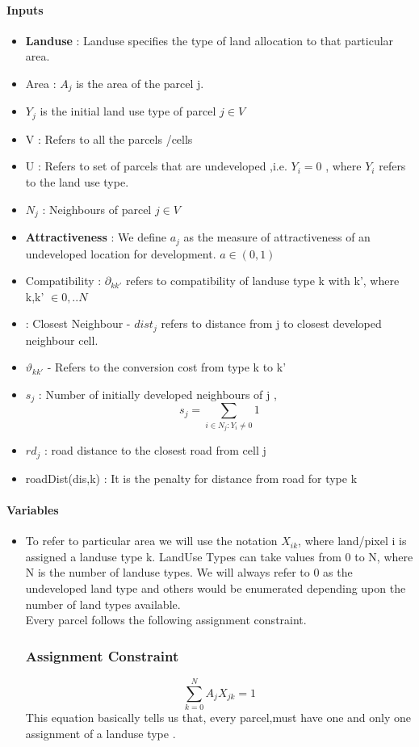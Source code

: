 \documentclass[12pt]{article} %
\begin{document}
\paragraph{Inputs\\}
\begin{itemize}
\item  \textbf{Landuse }: Landuse specifies the type of land allocation to that particular area.
\item Area : $A_j$ is the area of the parcel j.
\item $Y_j$ is the initial land use type of parcel $j \in V$
\item V : Refers to all the parcels /cells
\item U : Refers to set of parcels that are undeveloped ,i.e.
$ Y_{i} = 0$ , where  $Y_{i}$ refers to the land use type. 
\item $N_j$ : Neighbours of parcel $j \in V$    
\item \textbf{Attractiveness} : We define $a_j$  as the measure of attractiveness of an undeveloped location for development. 
$ a \in (0,1)$
\item Compatibility : $\partial_{kk'}$ refers to compatibility of landuse type k with k', where k,k' $\in {0,..N}$
\item : Closest Neighbour -  $dist_j$ refers to distance from j to closest developed neighbour cell.
\item $\vartheta_{kk'} $ - Refers to the conversion cost from  type k to k'
\item $s_j$ : Number of initially developed neighbours of j , $$ s_j = \sum_{i \in N_j: Y_i \neq 0} 1$$
\item $rd_j$ : road distance to the closest road from cell  j
\item roadDist(dis,k) : It is the penalty for distance from road for type k

\end{itemize}

\paragraph{Variables\\}
\begin{itemize}
\item  To refer to particular area we will use the notation $X_{ik}$, where land/pixel i is assigned a landuse type k. LandUse Types can take values from 0 to N, where N is the number of landuse types. We will always refer to 0 as the undeveloped land type and others would be enumerated depending upon the number of land types available.\\
Every parcel follows the following assignment constraint.

\subsubsection*{Assignment Constraint}
$$\sum_{k=0}^N A_j X_{jk} =1$$
This equation basically tells us that, every parcel,must have one and only one assignment of a landuse type .
\end{itemize}
\end{document}

